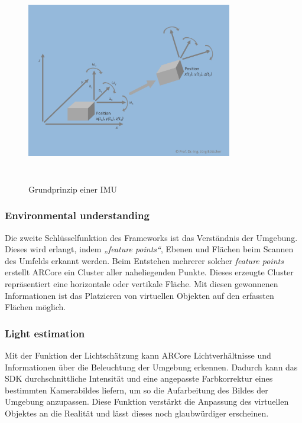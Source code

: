 \begin{figure}[hbt!]
    \centering
    \includegraphics[width=9cm,height=9cm,keepaspectratio]{2Grundlagen/Bilder/imu-Bsp.png}
    \caption{Grundprinzip einer IMU \cite{imubild.2020j}}
    \label{pic:Positionsberechnung}
\end{figure}
\subsubsection*{Environmental understanding}
Die zweite Schlüsselfunktion des Frameworks ist das Verständnis der Umgebung. Dieses wird erlangt, indem \textit{„feature points“}, Ebenen und 
Flächen beim Scannen des Umfelds erkannt werden. Beim Entstehen mehrerer solcher \textit{feature points} erstellt ARCore ein Cluster aller 
naheliegenden Punkte. Dieses erzeugte Cluster repräsentiert eine horizontale oder vertikale Fläche. Mit diesen gewonnenen Informationen ist das 
Platzieren von virtuellen Objekten auf den erfassten Flächen möglich.
\subsubsection*{Light estimation}
Mit der Funktion der Lichtschätzung kann ARCore Lichtverhältnisse und Informationen über die Beleuchtung der Umgebung erkennen. Dadurch kann das 
\acs{SDK} durchschnittliche Intensität und eine angepasste Farbkorrektur eines bestimmten Kamerabildes liefern, um so die Aufarbeitung des Bildes 
der Umgebung anzupassen. Diese Funktion verstärkt die Anpassung des virtuellen Objektes an die Realität und lässt dieses noch glaubwürdiger 
erscheinen.
